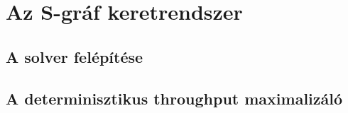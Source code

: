 \chapter{Az S-gráf keretrendszer} \label{s-graph_framework}
\section{A solver felépítése}
\section{A determinisztikus throughput maximalizáló} \label{throughput_solver}